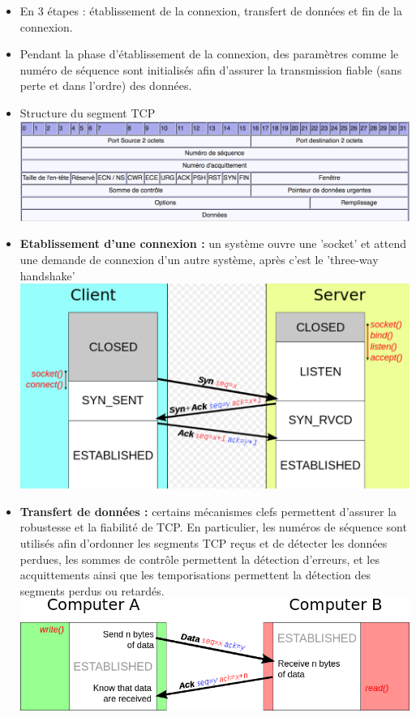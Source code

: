 \documentclass[a4paper,9pt, twocolumn]{article}
\begin{document}
	\begin{itemize}
		\item En 3 étapes : établissement de la connexion, transfert de données et fin de la connexion.
		\item Pendant la phase d'établissement de la connexion, des paramètres comme le numéro de séquence sont initialisés afin d'assurer la transmission fiable (sans perte et dans l'ordre) des données.
		\item Structure du segment TCP 
		\includegraphics[scale=0.28]{tc.png}
		\item \textbf{Etablissement d'une connexion :} un système ouvre une 'socket' et attend une demande de connexion d'un autre système, après c'est le 'three-way handshake'
			\includegraphics[scale=0.28]{hand.png}
		\item \textbf{Transfert de données :}
			certains mécanismes clefs permettent d'assurer la robustesse et la fiabilité de TCP.
			En particulier, les numéros de séquence sont utilisés afin d'ordonner les segments TCP reçus et de détecter les données perdues, les sommes de contrôle permettent la détection d'erreurs, et les acquittements ainsi que les temporisations permettent la détection des segments perdus ou retardés.
			\includegraphics[scale=0.28]{trans.png}

\end{itemize}
\end{document}
